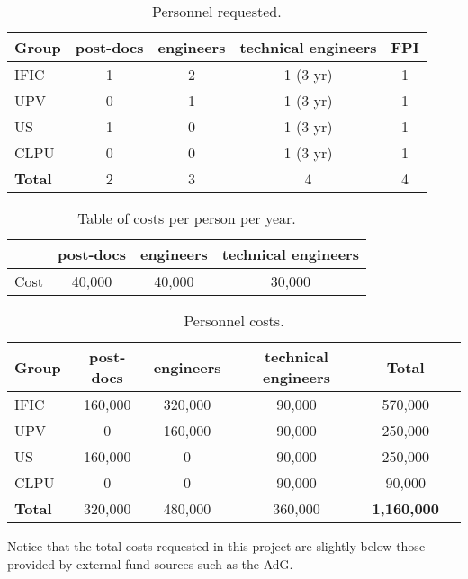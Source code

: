 \begin{table}[h!]
\begin{center}
\begin{tabular}{|l|c|c|c|c|}
\hline
Group &	post-docs	& engineers &	technical engineers & FPI\\
 \hline
IFIC &	1 &	2	&1 (3 yr) &	1\\			
UPV	  & 0	&1 &	1 (3 yr)  &	1 \\			
US	& 1 &	0 &	1 (3 yr)  &	 1\\	
CLPU	& 0 &	0 &	1 (3 yr)  &	 1\\			
 \hline
{\bf Total} & 2 & 3 & 4 & 4 \\
 \hline\hline
\end{tabular}  
\caption{Personnel requested.}
\label{tab.P}
\end{center}
\end{table} 

\begin{table}[h!]
\begin{center}
\begin{tabular}{|l|c|c|c|}
\hline
 &	post-docs	& engineers &	technical engineers \\
 \hline
Cost &	40,000 &	40,000	&30,000 \\					
 \hline\hline
\end{tabular}  
\caption{Table of costs per person per year.}
\label{tab.new:PT}
\end{center}
\end{table} 

\begin{table}[h!]
\begin{center}
\begin{tabular}{|l|c|c|c|c|c|}
\hline
Group &	post-docs	& engineers &	technical engineers &  Total \\
 \hline
IFIC	&160,000 &	320,000 &	90,000 & 570,000 \\
UPV	 &	0 & 160,000 &	90,000 &	250,000 \\
US	& 160,000 & 0 & 90,000 &	250,000\\
CLPU & 0 & 0 & 90,000 & 90,000\\
\hline
{\bf Total} & 320,000 & 480,000 & 360,000 & {\bf 1,160,000} \\
 \hline\hline
\end{tabular}  
\caption{Personnel costs.}
\label{tab.new:PC}
\end{center}
\end{table} 

Notice that the total costs requested in this project are slightly below those provided by external fund sources such as the AdG. 

